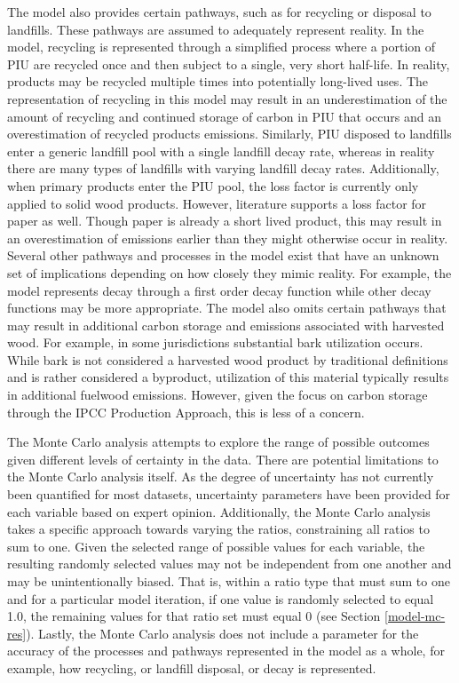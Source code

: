 \documentclass[
  openany]{book}
\begin{document}
The model also provides certain pathways, such as for recycling or disposal to landfills. These pathways are assumed to adequately represent reality. In the model, recycling is represented through a simplified process where a portion of PIU are recycled once and then subject to a single, very short half-life. In reality, products may be recycled multiple times into potentially long-lived uses. The representation of recycling in this model may result in an underestimation of the amount of recycling and continued storage of carbon in PIU that occurs and an overestimation of recycled products emissions. Similarly, PIU disposed to landfills enter a generic landfill pool with a single landfill decay rate, whereas in reality there are many types of landfills with varying landfill decay rates. Additionally, when primary products enter the PIU pool, the loss factor is currently only applied to solid wood products. However, literature supports a loss factor for paper as well. Though paper is already a short lived product, this may result in an overestimation of emissions earlier than they might otherwise occur in reality. Several other pathways and processes in the model exist that have an unknown set of implications depending on how closely they mimic reality. For example, the model represents decay through a first order decay function while other decay functions may be more appropriate. The model also omits certain pathways that may result in additional carbon storage and emissions associated with harvested wood. For example, in some jurisdictions substantial bark utilization occurs. While bark is not considered a harvested wood product by traditional definitions and is rather considered a byproduct, utilization of this material typically results in additional fuelwood emissions. However, given the focus on carbon storage through the IPCC Production Approach, this is less of a concern.

The Monte Carlo analysis attempts to explore the range of possible outcomes given different levels of certainty in the data. There are potential limitations to the Monte Carlo analysis itself. As the degree of uncertainty has not currently been quantified for most datasets, uncertainty parameters have been provided for each variable based on expert opinion. Additionally, the Monte Carlo analysis takes a specific approach towards varying the ratios, constraining all ratios to sum to one. Given the selected range of possible values for each variable, the resulting randomly selected values may not be independent from one another and may be unintentionally biased. That is, within a ratio type that must sum to one and for a particular model iteration, if one value is randomly selected to equal 1.0, the remaining values for that ratio set must equal 0 (see Section \ref{model-mc-res}). Lastly, the Monte Carlo analysis does not include a parameter for the accuracy of the processes and pathways represented in the model as a whole, for example, how recycling, or landfill disposal, or decay is represented.
\end{document}
